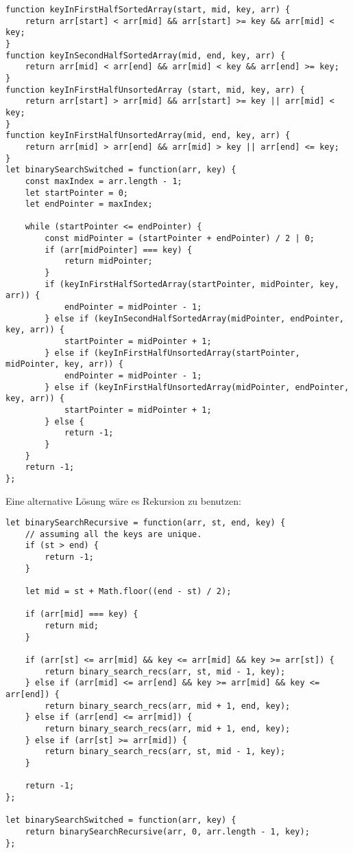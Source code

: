 \documentclass{book}
\begin{document}
\begin{lstlisting}[caption=My Javascript Example]
function keyInFirstHalfSortedArray(start, mid, key, arr) {
	return arr[start] < arr[mid] && arr[start] >= key && arr[mid] < key;
}
function keyInSecondHalfSortedArray(mid, end, key, arr) {
	return arr[mid] < arr[end] && arr[mid] < key && arr[end] >= key;
}
function keyInFirstHalfUnsortedArray (start, mid, key, arr) {
	return arr[start] > arr[mid] && arr[start] >= key || arr[mid] < key;
}
function keyInFirstHalfUnsortedArray(mid, end, key, arr) {
	return arr[mid] > arr[end] && arr[mid] > key || arr[end] <= key;
}
let binarySearchSwitched = function(arr, key) {
	const maxIndex = arr.length - 1;
	let startPointer = 0;
	let endPointer = maxIndex;

	while (startPointer <= endPointer) {
		const midPointer = (startPointer + endPointer) / 2 | 0;
		if (arr[midPointer] === key) {
			return midPointer;
		}
		if (keyInFirstHalfSortedArray(startPointer, midPointer, key, arr)) {
			endPointer = midPointer - 1;
		} else if (keyInSecondHalfSortedArray(midPointer, endPointer, key, arr)) {
			startPointer = midPointer + 1;
		} else if (keyInFirstHalfUnsortedArray(startPointer, midPointer, key, arr)) {
			endPointer = midPointer - 1;
		} else if (keyInFirstHalfUnsortedArray(midPointer, endPointer, key, arr)) {
			startPointer = midPointer + 1;
		} else {
			return -1;
		}
	}
	return -1;
};
\end{lstlisting}

Eine alternative Lösung wäre es Rekursion zu benutzen:
\begin{lstlisting}[caption=My Javascript Example]
let binarySearchRecursive = function(arr, st, end, key) {
	// assuming all the keys are unique.
	if (st > end) {
		return -1;
	}
	
	let mid = st + Math.floor((end - st) / 2);
	
	if (arr[mid] === key) {
		return mid;
	}
	
	if (arr[st] <= arr[mid] && key <= arr[mid] && key >= arr[st]) {
		return binary_search_recs(arr, st, mid - 1, key);
	} else if (arr[mid] <= arr[end] && key >= arr[mid] && key <= arr[end]) {
		return binary_search_recs(arr, mid + 1, end, key);
	} else if (arr[end] <= arr[mid]) {
		return binary_search_recs(arr, mid + 1, end, key);
	} else if (arr[st] >= arr[mid]) {
		return binary_search_recs(arr, st, mid - 1, key);
	} 
	
	return -1;
};

let binarySearchSwitched = function(arr, key) {
	return binarySearchRecursive(arr, 0, arr.length - 1, key);
};
\end{lstlisting}
\end{document}
